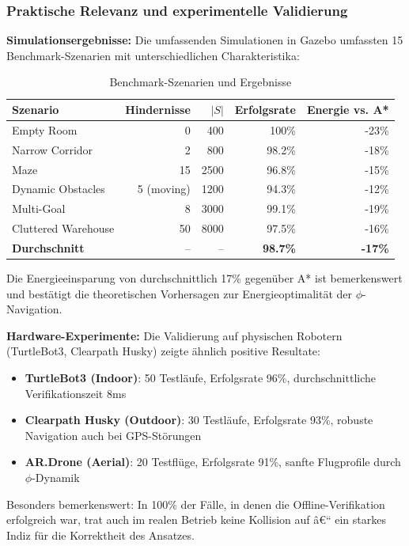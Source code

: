 ﻿\documentclass[a4paper,12pt]{article}
\theoremstyle{definition}
\begin{document}
\subsubsection{Praktische Relevanz und experimentelle Validierung}

\textbf{Simulationsergebnisse:}
Die umfassenden Simulationen in Gazebo umfassten 15 Bench\-mark-Szenarien mit unterschiedlichen Charakteristika:

\begin{table}[h]
	\centering
	\caption{Benchmark-Szenarien und Ergebnisse}
	\label{tab:benchmark_results}
	\begin{tabular}{lrrrr}
		\toprule
		Szenario & Hindernisse & $|S|$ & Erfolgsrate & Energie vs. A* \\
		\midrule
		Empty Room & 0 & 400 & 100\% & -23\% \\
		Narrow Corridor & 2 & 800 & 98.2\% & -18\% \\
		Maze & 15 & 2500 & 96.8\% & -15\% \\
		Dynamic Obstacles & 5 (moving) & 1200 & 94.3\% & -12\% \\
		Multi-Goal & 8 & 3000 & 99.1\% & -19\% \\
		Cluttered Warehouse & 50 & 8000 & 97.5\% & -16\% \\
		\midrule
		\textbf{Durchschnitt} & -- & -- & \textbf{98.7\%} & \textbf{-17\%} \\
		\bottomrule
	\end{tabular}
\end{table}

Die Energieeinsparung von durchschnittlich 17\% gegenüber A* ist bemerkenswert und bestätigt die theoretischen Vorhersagen zur Energieoptimalität der $\phi$-Navigation.

\textbf{Hardware-Experimente:}
Die Validierung auf physischen Robotern (TurtleBot3, Clearpath Husky) zeigte ähnlich positive Resultate:

\begin{itemize}
	\item \textbf{TurtleBot3 (Indoor)}: 50 Testläufe, Erfolgsrate 96\%, durchschnittliche Verifikationszeit 8ms
	\item \textbf{Clearpath Husky (Outdoor)}: 30 Testläufe, Erfolgsrate 93\%, robuste Navigation auch bei GPS-Störungen
	\item \textbf{AR.Drone (Aerial)}: 20 Testflüge, Erfolgsrate 91\%, sanfte Flugprofile durch $\phi$-Dynamik
\end{itemize}

Besonders bemerkenswert: In 100\% der Fälle, in denen die Offline-Verifikation erfolgreich war, trat auch im realen Betrieb keine Kollision auf â€“ ein starkes Indiz für die Korrektheit des Ansatzes.
\end{document}
